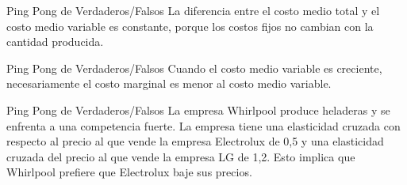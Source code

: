 \documentclass{beamer}
\begin{document}
\begin{frame}{Ping Pong de Verdaderos/Falsos}
    \centering
    La diferencia entre el costo medio total y el costo medio variable es constante, porque los costos fijos no cambian con la cantidad producida.
\end{frame}

\begin{frame}{Ping Pong de Verdaderos/Falsos}
    \centering
    Cuando el costo medio variable es creciente, necesariamente el costo marginal es menor al costo medio variable.
\end{frame}


\begin{frame}{Ping Pong de Verdaderos/Falsos}
    \centering
    La empresa Whirlpool produce heladeras y se enfrenta a una competencia fuerte. La empresa tiene una elasticidad cruzada con respecto al precio al que vende la empresa Electrolux de 0,5 y una elasticidad cruzada del precio al que vende la empresa LG de 1,2. Esto implica que Whirlpool prefiere que Electrolux baje sus precios.
\end{frame}
\end{document}

